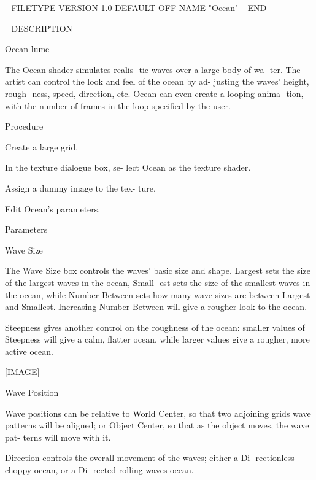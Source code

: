 _FILETYPE
VERSION	 1.0
DEFAULT	 OFF
NAME	"Ocean"
_END


_DESCRIPTION


Ocean                                    lume
---------------------------------------------


       The Ocean shader simulates realis-
       tic waves over a large body of wa-
       ter. The artist can control the
       look and feel of the ocean by ad-
       justing the waves' height, rough-
       ness, speed, direction, etc. Ocean
       can even create a looping anima-
       tion, with the number of frames in
       the loop specified by the user.



  Procedure

        Create a large grid.

        In the texture dialogue box, se-
        lect Ocean as the texture shader.

        Assign a dummy image to the tex-
        ture.

        Edit Ocean's parameters.



  Parameters



       Wave Size

       The Wave Size box controls the
       waves' basic size and shape.
       Largest sets the size of the
       largest waves in the ocean, Small-
       est sets the size of the smallest
       waves in the ocean, while Number
       Between sets how many wave sizes
       are between Largest and Smallest.
       Increasing Number Between will give
       a rougher look to the ocean.

       Steepness gives another control on
       the roughness of the ocean: smaller
       values of Steepness will give a
       calm, flatter ocean, while larger
       values give a rougher, more active
       ocean.

       [IMAGE]



       Wave Position

       Wave positions can be relative to
       World Center, so that two adjoining
       grids wave patterns will be
       aligned; or Object Center, so that
       as the object moves, the wave pat-
       terns will move with it.

       Direction controls the overall
       movement of the waves; either a Di-
       rectionless choppy ocean, or a Di-
       rected rolling-waves ocean.



